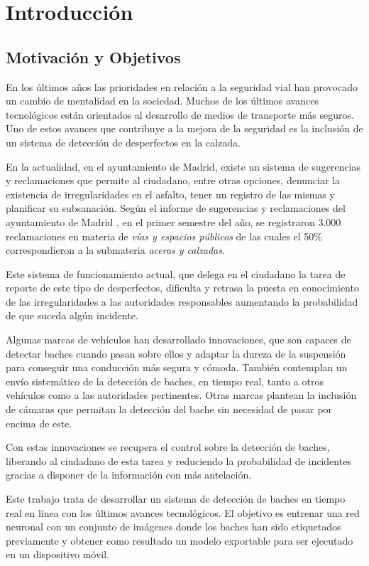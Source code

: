 \section{Introducción}

\subsection{Motivación y Objetivos}

En los últimos años las prioridades en relación a la seguridad vial han provocado un cambio de mentalidad en la sociedad.  Muchos de los últimos avances tecnológicos están orientados al desarrollo de medios de transporte más seguros. Uno de estos avances que contribuye a la mejora de la seguridad es la inclusión de un sistema de detección de desperfectos en la calzada.

En la actualidad, en el ayuntamiento de Madrid, existe un sistema de sugerencias y reclamaciones \cite{s1_syr} que permite al ciudadano, entre otras opciones, denunciar la existencia de irregularidades en el asfalto, tener un registro de las mismas y planificar su subsanación. Según el informe de sugerencias y reclamaciones del ayuntamiento de Madrid \cite{s1_syrreport}, en el primer semestre del año, se registraron 3.000 reclamaciones en materia de \textit{vías y espacios públicos} de las cuales el 50\% correspondieron a la submateria \textit{aceras y calzadas}.

Este sistema de funcionamiento actual, que delega en el ciudadano la tarea de reporte de este tipo de desperfectos, dificulta y retrasa la puesta en conocimiento de las irregularidades a las autoridades responsables aumentando la probabilidad de que suceda algún incidente.

Algunas marcas de vehículos han desarrollado innovaciones, que son capaces de detectar baches cuando pasan sobre ellos y adaptar la dureza de la suspensión para conseguir una conducción más segura y cómoda. También contemplan un envío sistemático de la detección de baches, en tiempo real, tanto a otros vehículos como a las autoridades pertinentes. Otras marcas plantean la inclusión de cámaras que permitan la detección del bache sin necesidad de pasar por encima de este.

Con estas innovaciones se recupera el control sobre la detección de baches, liberando al ciudadano de esta tarea y reduciendo la probabilidad de incidentes gracias a disponer de la información con más antelación.

Este trabajo trata de desarrollar un sistema de detección de baches en tiempo real en línea con los últimos avances tecnológicos. El objetivo es entrenar una red neuronal con un conjunto de imágenes donde los baches han sido etiquetados previamente y obtener como resultado un modelo exportable para ser ejecutado en un dispositivo móvil.

